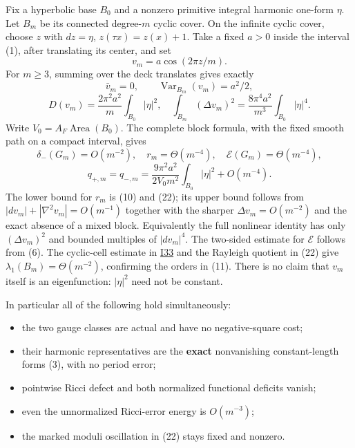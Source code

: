 \documentclass[
  11pt,
]{article}
\providecommand{\tightlist}{%
  \setlength{\itemsep}{0pt}\setlength{\parskip}{0pt}}
\begin{document}
Fix a hyperbolic base \(B_0\) and a nonzero primitive integral harmonic
one-form \(\eta\). Let \(B_m\) be its connected degree-\(m\) cyclic
cover. On the infinite cyclic cover, choose \(z\) with \(dz=\eta\),
\(z(\tau x)=z(x)+1\). Take a fixed \(a>0\) inside the interval (1),
after translating its center, and set \[
             v_m=a\cos(2\pi z/m).                      \tag{21}
\] For \(m\ge3\), summing over the deck translates gives exactly \[
 \bar v_m=0,\qquad\operatorname{Var}_{B_m}(v_m)=a^2/2,
\] \[
 D(v_m)=\frac{2\pi^2a^2}{m}\int_{B_0}|\eta|^2,
\quad
 \int_{B_m}(\Delta v_m)^2
       =\frac{8\pi^4a^2}{m^3}\int_{B_0}|\eta|^4.       \tag{22}
\] Write \(V_0=A_F\operatorname{Area}(B_0)\). The complete block
formula, with the fixed smooth path on a compact interval, gives \[
 \delta_-(G_m)=O(m^{-2}),\quad r_m=\Theta(m^{-4}),\quad
 \mathcal E(G_m)=\Theta(m^{-4}),
\] \[
 \boxed{q_{+,m}=q_{-,m}
  =\frac{9\pi^2a^2}{2V_0m^2}\int_{B_0}|\eta|^2+O(m^{-4}).}
                                                               \tag{23}
\] The lower bound for \(r_m\) is (10) and (22); its upper bound follows
from \(|dv_m|+|\nabla^2v_m|=O(m^{-1})\) together with the sharper
\(\Delta v_m=O(m^{-2})\) and the exact absence of a mixed block.
Equivalently the full nonlinear identity has only \((\Delta v_m)^2\) and
bounded multiples of \(|dv_m|^4\). The two-sided estimate for
\(\mathcal E\) follows from (6). The cyclic-cell estimate in
\href{20260924_integrable_kernel_cyclic_repair.md}{I33} and the Rayleigh
quotient in (22) give \(\lambda_1(B_m)=\Theta(m^{-2})\), confirming the
orders in (11). There is no claim that \(v_m\) itself is an
eigenfunction: \(|\eta|^2\) need not be constant.

In particular all of the following hold simultaneously:

\begin{itemize}
\tightlist
\item
  the two gauge classes are actual and have no negative-square cost;
\item
  their harmonic representatives are the \textbf{exact} nonvanishing
  constant-length forms (3), with no period error;
\item
  pointwise Ricci defect and both normalized functional deficits vanish;
\item
  even the unnormalized Ricci-error energy is \(O(m^{-3})\);
\item
  the marked moduli oscillation in (22) stays fixed and nonzero.
\end{itemize}
\end{document}
